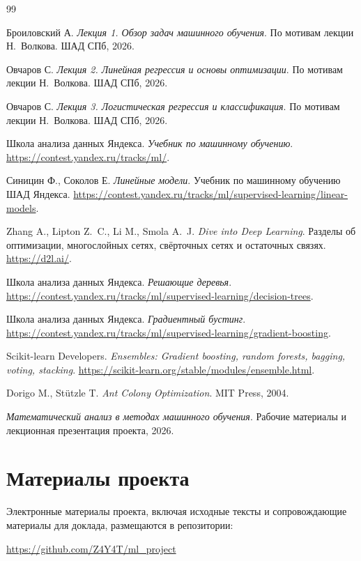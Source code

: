\documentclass[12pt,a4paper]{article}
\begin{document}
\begin{thebibliography}{99}

Броиловский А.
\textit{Лекция 1. Обзор задач машинного обучения}.
По мотивам лекции Н.~Волкова. ШАД СПб, 2026.

Овчаров С.
\textit{Лекция 2. Линейная регрессия и основы оптимизации}.
По мотивам лекции Н.~Волкова. ШАД СПб, 2026.

Овчаров С.
\textit{Лекция 3. Логистическая регрессия и классификация}.
По мотивам лекции Н.~Волкова. ШАД СПб, 2026.

Школа анализа данных Яндекса.
\textit{Учебник по машинному обучению}.
\url{https://contest.yandex.ru/tracks/ml/}.

Синицин Ф., Соколов Е.
\textit{Линейные модели}.
Учебник по машинному обучению ШАД Яндекса.
\url{https://contest.yandex.ru/tracks/ml/supervised-learning/linear-models}.

Zhang A., Lipton Z.~C., Li M., Smola A.~J.
\textit{Dive into Deep Learning}.
Разделы об оптимизации, многослойных сетях,
свёрточных сетях и остаточных связях.
\url{https://d2l.ai/}.

Школа анализа данных Яндекса.
\textit{Решающие деревья}.
\url{https://contest.yandex.ru/tracks/ml/supervised-learning/decision-trees}.

Школа анализа данных Яндекса.
\textit{Градиентный бустинг}.
\url{https://contest.yandex.ru/tracks/ml/supervised-learning/gradient-boosting}.

Scikit-learn Developers.
\textit{Ensembles: Gradient boosting, random forests, bagging, voting, stacking}.
\url{https://scikit-learn.org/stable/modules/ensemble.html}.

Dorigo M., St\"utzle T.
\textit{Ant Colony Optimization}.
MIT Press, 2004.

\textit{Математический анализ в методах машинного обучения}.
Рабочие материалы и лекционная презентация проекта, 2026.

\end{thebibliography}

\appendix
\section{Материалы проекта}

Электронные материалы проекта, включая исходные тексты
и сопровождающие материалы для доклада, размещаются
в репозитории:
\begin{center}
    \url{https://github.com/Z4Y4T/ml_project}
\end{center}
\end{document}
